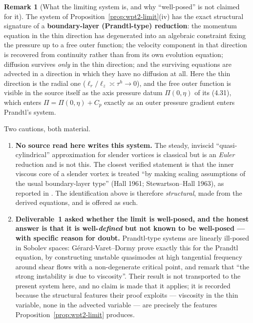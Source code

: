 \documentclass[11pt]{article}
\theoremstyle{definition}
\newtheorem{remark}[theorem]{Remark}
\theoremstyle{remark}
\begin{document}
\begin{remark}[What the limiting system is, and why ``well-posed'' is not
  claimed for it]\label{rem:wpt2-prandtl}
  The system of Proposition~\ref{prop:wpt2-limit}(iv) has the exact
  structural signature of a \textbf{boundary-layer (Prandtl-type) reduction}:
  the momentum equation in the thin direction has degenerated into an
  algebraic constraint fixing the pressure up to a free outer function;
  the velocity component in that direction is recovered from continuity
  rather than from its own evolution equation; diffusion survives \emph{only}
  in the thin direction; and the surviving equations are advected in a
  direction in which they have no diffusion at all. Here the thin direction
  is the radial one ($\ell_r/\ell_z\asymp\tau^h\to0$), and the free outer
  function is visible in the source itself as the axis pressure datum
  $\Pi(0,\eta)$ of its (4.31), which enters
  $\Pi=\Pi(0,\eta)+C_p$ exactly as an outer pressure gradient enters
  Prandtl's system.

  Two cautions, both material.
  \begin{enumerate}[label=(\alph*)]
    \item \textbf{No source read here writes this system.} The steady,
      inviscid ``quasi-cylindrical'' approximation for slender vortices is
      classical but is an \emph{Euler} reduction and is not this. The closest
      verified statement is that the inner viscous core of a slender vortex
      is treated ``by making scaling assumptions of the usual boundary-layer
      type'' (Hall 1961; Stewartson--Hall 1963), as reported in
      \cite{Mayer2013Long}. The identification above is therefore
      \emph{structural}, made from the derived equations, and is offered as
      such.
    \item \textbf{Deliverable~1 asked whether the limit is well-posed, and
      the honest answer is that it is well-\emph{defined} but not known to be
      well-posed --- with specific reason for doubt.} Prandtl-type systems
      are linearly ill-posed in Sobolev spaces: G\'erard-Varet--Dormy
      \cite{GerardVaretDormy2010} prove exactly this for the Prandtl
      equation, by constructing unstable quasimodes at high tangential
      frequency around shear flows with a non-degenerate critical point, and
      remark that ``the strong instability is due to viscosity''. Their
      result is not transported to the present system here, and no claim is
      made that it applies; it is recorded because the structural features
      their proof exploits --- viscosity in the thin variable, none in the
      advected variable --- are precisely the features
      Proposition~\ref{prop:wpt2-limit} produces.
  \end{enumerate}
\end{remark}
\end{document}
